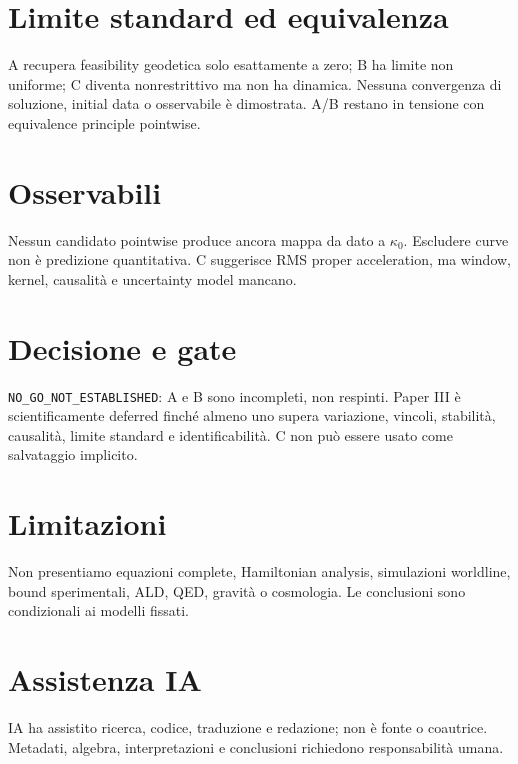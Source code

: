 \documentclass[11pt,a4paper]{article}
\begin{document}
\section{Limite standard ed equivalenza}\label{sec:p2-limits}
A recupera feasibility geodetica solo esattamente a zero; B ha limite non uniforme; C diventa nonrestrittivo ma non ha dinamica. Nessuna convergenza di soluzione, initial data o osservabile è dimostrata. A/B restano in tensione con equivalence principle pointwise.

\section{Osservabili}\label{sec:p2-observables}
Nessun candidato pointwise produce ancora mappa da dato a $\kappa_0$. Escludere curve non è predizione quantitativa. C suggerisce RMS proper acceleration, ma window, kernel, causalità e uncertainty model mancano.

\section{Decisione e gate}\label{sec:p2-decision}
\texttt{NO\_GO\_NOT\_ESTABLISHED}: A e B sono incompleti, non respinti. Paper III è scientificamente deferred finché almeno uno supera variazione, vincoli, stabilità, causalità, limite standard e identificabilità. C non può essere usato come salvataggio implicito.

\section{Limitazioni}\label{sec:p2-limitations}
Non presentiamo equazioni complete, Hamiltonian analysis, simulazioni worldline, bound sperimentali, ALD, QED, gravità o cosmologia. Le conclusioni sono condizionali ai modelli fissati.

\section{Assistenza IA}\label{sec:p2-ai}
IA ha assistito ricerca, codice, traduzione e redazione; non è fonte o coautrice. Metadati, algebra, interpretazioni e conclusioni richiedono responsabilità umana.



\end{document}
